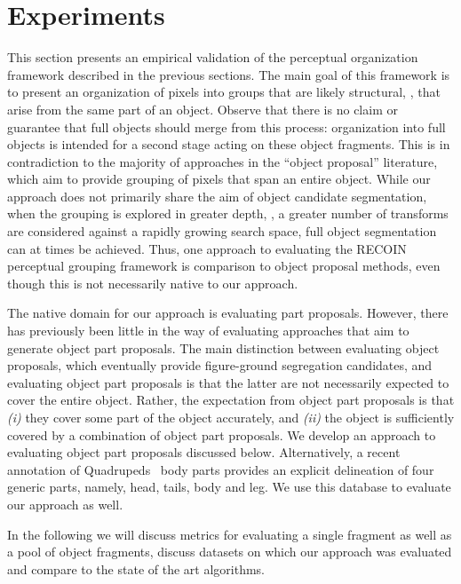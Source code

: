 \newpage
\section{Experiments}
\label{sec:experiments}

This section presents an empirical validation of the perceptual organization framework described in the previous sections. The main goal of this framework is to present an organization of pixels into groups that are likely structural, \ie, that arise from the same part of an object. Observe that there is no claim or guarantee that full objects should merge from this process: organization into full objects is intended for a second stage acting on these object fragments. This is in contradiction to the majority of approaches in the “object proposal” literature, which aim to provide grouping of pixels that span an entire object. While our approach does not primarily share the aim of object candidate segmentation, when the grouping is explored in greater depth, \ie, a greater number of transforms are considered against a rapidly growing search space, full object segmentation can at times be achieved. Thus, one approach to evaluating the RECOIN perceptual grouping framework is comparison to object proposal methods, even though this is not necessarily native to our approach. 

The native domain for our approach is evaluating part proposals. However, there has previously been little in the way of evaluating approaches that aim to generate object part proposals. The main distinction between evaluating object proposals, which eventually provide figure-ground segregation candidates, and evaluating object part proposals is that the latter are not necessarily expected to cover the entire object. Rather, the expectation from object part proposals is that \emph{(i)} they cover some part of the object accurately, and \emph{(ii)} the object is sufficiently covered by a combination of object part proposals. We develop an approach to evaluating object part proposals discussed below. Alternatively, a recent annotation of Quadrupeds~\cite{Wang:etal:ICCV15} body parts provides an explicit delineation of four generic parts, namely, head, tails, body and leg. We use this database to evaluate our approach as well. 

In the following we will discuss metrics for evaluating a single fragment as well as a pool of object fragments, discuss datasets on which our approach was evaluated and compare to the state of the art algorithms. 


